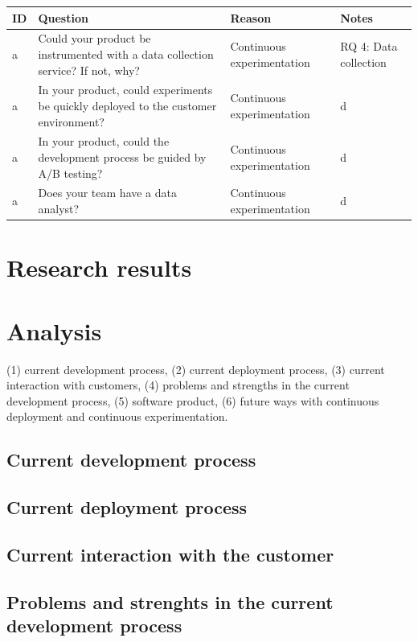\documentclass[english]{tktltiki2}
\theoremstyle{definition}
\theoremstyle{remark}
\begin{document}
\begin{center}
    \begin{tabular}{ | l | l | l | p{5cm} |}
    \hline
    ID & Question & Reason & Notes \\ \hline
    a & Could your product be instrumented with a data collection service? If not, why? & Continuous experimentation & RQ 4: Data collection \\ \hline
    a & In your product, could experiments be quickly deployed to the customer environment? & Continuous experimentation & d \\ \hline
    a & In your product, could the development process be guided by A/B testing? & Continuous experimentation & d \\ \hline
    a & Does your team have a data analyst? & Continuous experimentation & d \\ \hline
    \hline
    \end{tabular}
\end{center}

\section{Research results}

\section{Analysis}

 (1) current development process, (2) current deployment process, (3) current interaction with customers, (4) problems and strengths in the current development process, (5) software product, (6) future ways with continuous deployment and continuous experimentation.

\subsection{Current development process}

\subsection{Current deployment process}

\subsection{Current interaction with the customer}

\subsection{Problems and strenghts in the current development process}
\end{document}
